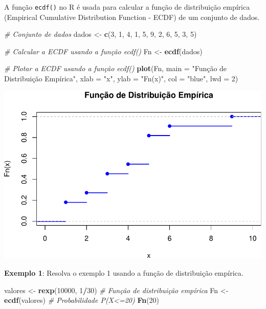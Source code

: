 \documentclass[
]{book}
\newenvironment{Shaded}{\begin{snugshade}}{\end{snugshade}}
\newcommand{\AttributeTok}[1]{\textcolor[rgb]{0.13,0.29,0.53}{#1}}
\newcommand{\CommentTok}[1]{\textcolor[rgb]{0.56,0.35,0.01}{\textit{#1}}}
\newcommand{\DecValTok}[1]{\textcolor[rgb]{0.00,0.00,0.81}{#1}}
\newcommand{\FunctionTok}[1]{\textcolor[rgb]{0.13,0.29,0.53}{\textbf{#1}}}
\newcommand{\NormalTok}[1]{#1}
\newcommand{\OtherTok}[1]{\textcolor[rgb]{0.56,0.35,0.01}{#1}}
\newcommand{\SpecialCharTok}[1]{\textcolor[rgb]{0.81,0.36,0.00}{\textbf{#1}}}
\newcommand{\StringTok}[1]{\textcolor[rgb]{0.31,0.60,0.02}{#1}}
\begin{document}
A função \texttt{ecdf()} no R é usada para calcular a função de distribuição
empírica (Empirical Cumulative Distribution Function - ECDF) de um
conjunto de dados.

\begin{Shaded}
\begin{Highlighting}[]
\CommentTok{\# Conjunto de dados}
\NormalTok{dados }\OtherTok{\textless{}{-}} \FunctionTok{c}\NormalTok{(}\DecValTok{3}\NormalTok{, }\DecValTok{1}\NormalTok{, }\DecValTok{4}\NormalTok{, }\DecValTok{1}\NormalTok{, }\DecValTok{5}\NormalTok{, }\DecValTok{9}\NormalTok{, }\DecValTok{2}\NormalTok{, }\DecValTok{6}\NormalTok{, }\DecValTok{5}\NormalTok{, }\DecValTok{3}\NormalTok{, }\DecValTok{5}\NormalTok{)}

\CommentTok{\# Calcular a ECDF usando a função ecdf()}
\NormalTok{Fn }\OtherTok{\textless{}{-}} \FunctionTok{ecdf}\NormalTok{(dados)}

\CommentTok{\# Plotar a ECDF usando a função ecdf()}
\FunctionTok{plot}\NormalTok{(Fn, }\AttributeTok{main =} \StringTok{"Função de Distribuição Empírica"}\NormalTok{, }\AttributeTok{xlab =} \StringTok{"x"}\NormalTok{, }\AttributeTok{ylab =} \StringTok{"Fn(x)"}\NormalTok{, }\AttributeTok{col =} \StringTok{"blue"}\NormalTok{, }\AttributeTok{lwd =} \DecValTok{2}\NormalTok{)}
\end{Highlighting}
\end{Shaded}

\includegraphics{introR_files/figure-latex/unnamed-chunk-292-1.pdf}

\textbf{Exemplo 1}: Resolva o exemplo 1 usando a função de distribuição
empírica.

\begin{Shaded}
\begin{Highlighting}[]
\NormalTok{valores }\OtherTok{\textless{}{-}} \FunctionTok{rexp}\NormalTok{(}\DecValTok{10000}\NormalTok{, }\DecValTok{1}\SpecialCharTok{/}\DecValTok{30}\NormalTok{)}
\CommentTok{\# Função de distribuição empírica}
\NormalTok{Fn }\OtherTok{\textless{}{-}} \FunctionTok{ecdf}\NormalTok{(valores)}
\CommentTok{\# Probabilidade P(X\textless{}=20)}
\FunctionTok{Fn}\NormalTok{(}\DecValTok{20}\NormalTok{)}
\end{Highlighting}
\end{Shaded}
\end{document}
